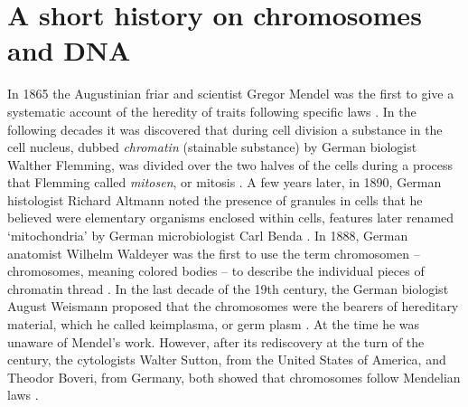 \section{A short history on chromosomes and DNA} \label{intro_history}
In 1865 the Augustinian friar and scientist Gregor Mendel was the first to give a systematic account of the heredity of traits following specific laws \cite{Mendel_1866}. 
In the following decades it was discovered that during cell division a substance in the cell nucleus, dubbed \textsl{chromatin} (stainable substance) by German biologist Walther Flemming, was divided over the two halves of the cells during a process that Flemming called \textsl{mitosen}, or mitosis \cite{Schneider_1873,Flemming_1882,Cremer_2006}. 
A few years later, in 1890, German histologist Richard Altmann noted the presence of granules in cells that he believed were elementary organisms enclosed within cells, features later renamed ‘mitochondria’ by German microbiologist Carl Benda \cite{Altmann_1894,Benda_1898}. 
In 1888, German anatomist Wilhelm Waldeyer was the first to use the term chromosomen – chromosomes, meaning colored bodies – to describe the individual pieces of chromatin thread \cite{Waldeyer_1888,Cremer_2006}. 
In the last decade of the 19th century, the German biologist August Weismann proposed that the chromosomes were the bearers of hereditary material, which he called keimplasma, or germ plasm \cite{Weismann_1892}. 
At the time he was unaware of Mendel’s work. However, after its rediscovery at the turn of the century, the cytologists Walter Sutton, from the United States of America, and Theodor Boveri, from Germany, both showed that chromosomes follow Mendelian laws \cite{Sutton_1902,Boveri_1904,Boveri_1909,Crow_2002}. 

